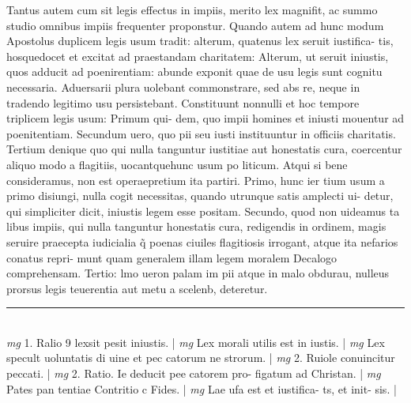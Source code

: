 \documentclass{article}
\begin{document}
\begin{pages}
Tantus autem cum sit legis effectus in impiis, merito lex magnifit, ac summo studio omnibus impiis frequenter proponstur. Quando autem ad hunc modum Apostolus duplicem legis usum tradit: alterum, quatenus lex seruit iustifica- tis, hosquedocet et excitat ad praestandam charitatem: Alterum, ut seruit iniustis, quos adducit ad poenirentiam: abunde exponit quae de usu legis sunt cognitu necessaria. Aduersarii plura uolebant commonstrare, sed abs re, neque  in tradendo legitimo usu persistebant. Constituunt nonnulli et hoc tempore triplicem legis usum: Primum qui- dem, quo impii homines et iniusti mouentur ad poenitentiam. Secundum uero, quo pii seu iusti instituuntur in officiis charitatis. Tertium denique  quo qui nulla tanguntur iustitiae aut honestatis cura, coercentur aliquo modo a flagitiis, uocantquehunc usum po liticum. Atqui si bene consideramus, non est operaepretium ita partiri. Primo, hunc ier tium usum a primo disiungi, nulla cogit necessitas, quando utrunque  satis amplecti ui- detur, qui simpliciter dicit, iniustis legem esse positam. Secundo, quod non uideamus ta libus impiis, qui nulla tanguntur honestatis cura, redigendis in ordinem, magis seruire praecepta iudicialia q̃ poenas ciuiles flagitiosis irrogant, atque  ita nefarios conatus repri- munt quam generalem illam legem moralem Decalogo comprehensam. Tertio: lmo ueron palam im pii atque  in malo obdurau, nulleus prorsus legis teuerentia aut metu a scelenb, deteretur.  \pend
\vspace{0.5cm}\noindent
\vspace{0.2cm}\rule{1cm}{0.2pt}\\ 
\hspace{0.2cm}\textit{mg}
\footnotesize 1. Ralio 9 lexsit pesit iniustis. 
\normalsize| 
\hspace{0.2cm}\textit{mg}
\footnotesize Lex morali utilis est in iustis. 
\normalsize| 
\hspace{0.2cm}\textit{mg}
\footnotesize Lex specult uoluntatis di uine et pec catorum ne strorum. 
\normalsize| 
\hspace{0.2cm}\textit{mg}
\footnotesize 2. Ruiole conuincitur peccati. 
\normalsize| 
\hspace{0.2cm}\textit{mg}
\footnotesize 2. Ratio. Ie deducit pee catorem pro- figatum ad Christan. 
\normalsize| 
\hspace{0.2cm}\textit{mg}
\footnotesize Pates pan tentiae Contritio c Fides. 
\normalsize| 
\hspace{0.2cm}\textit{mg}
\footnotesize Lae ufa est et iustifica- ts, et init- sis. 
\normalsize| 

\end{pages}
\end{document}
